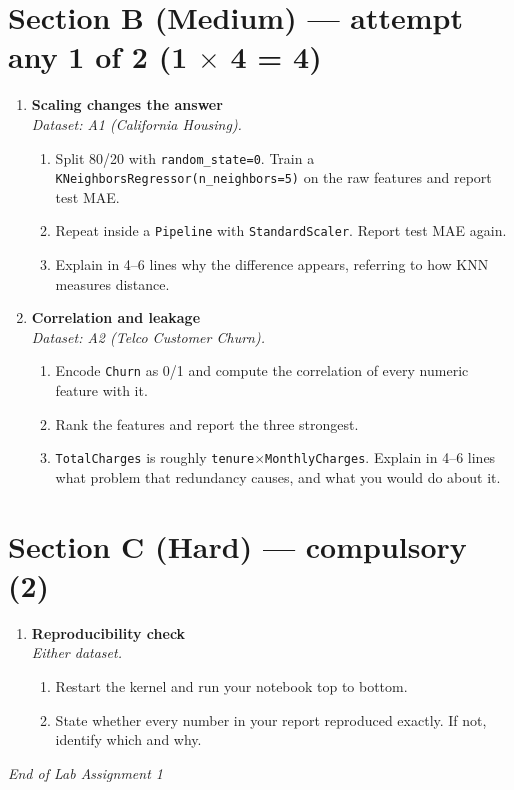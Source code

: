 \documentclass[11pt,a4paper]{article}
\begin{document}
\section*{Section B (Medium) --- attempt any 1 of 2 \quad (1 $\times$ 4 = 4)}

\begin{enumerate}[label=\textbf{B\arabic*.}, leftmargin=*]

  \item \textbf{Scaling changes the answer} \\
    \emph{Dataset: A1 (California Housing).}
    \begin{enumerate}[label=(\alph*), leftmargin=*]
      \item Split 80/20 with \texttt{random\_state=0}. Train a \texttt{KNeighborsRegressor(n\_neighbors=5)} on the raw features and report test MAE.
      \item Repeat inside a \texttt{Pipeline} with \texttt{StandardScaler}. Report test MAE again.
      \item Explain in 4--6 lines why the difference appears, referring to how KNN measures distance.
    \end{enumerate}

  \item \textbf{Correlation and leakage} \\
    \emph{Dataset: A2 (Telco Customer Churn).}
    \begin{enumerate}[label=(\alph*), leftmargin=*]
      \item Encode \texttt{Churn} as 0/1 and compute the correlation of every numeric feature with it.
      \item Rank the features and report the three strongest.
      \item \texttt{TotalCharges} is roughly \texttt{tenure}$\times$\texttt{MonthlyCharges}. Explain in 4--6 lines what problem that redundancy causes, and what you would do about it.
    \end{enumerate}

\end{enumerate}

\section*{Section C (Hard) --- compulsory \quad (2)}

\begin{enumerate}[label=\textbf{C\arabic*.}, leftmargin=*]

  \item \textbf{Reproducibility check} \\
    \emph{Either dataset.}
    \begin{enumerate}[label=(\alph*), leftmargin=*]
      \item Restart the kernel and run your notebook top to bottom.
      \item State whether every number in your report reproduced exactly. If not, identify which and why.
    \end{enumerate}

\end{enumerate}

\vfill\noindent\textit{End of Lab Assignment 1}

\notesources{\AMLLabSources}
\end{document}

